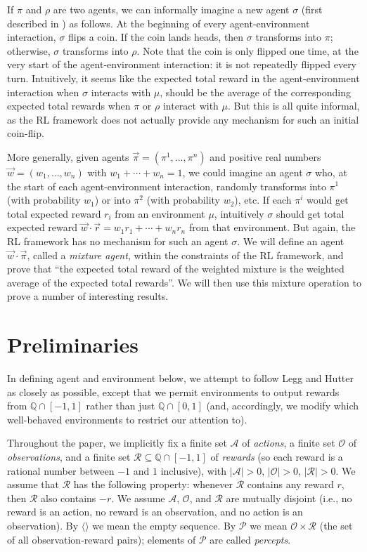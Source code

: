 \documentclass[twoside]{article}
\begin{document}
If $\pi$ and $\rho$ are two agents, we can informally imagine a new agent
$\sigma$ (first described in \cite{alexander2021reward})
as follows. At the beginning of every agent-environment interaction,
$\sigma$ flips a coin. If the coin lands heads, then $\sigma$ transforms into
$\pi$; otherwise, $\sigma$ transforms into $\rho$. Note that the coin is only
flipped one time, at the very start of the agent-environment interaction:
it is not repeatedly flipped every turn. Intuitively, it seems like the
expected total reward in the agent-environment interaction
when $\sigma$ interacts with $\mu$, should be the average
of the corresponding expected total rewards when $\pi$ or $\rho$ interact
with $\mu$. But this is all quite informal, as the RL
framework does not actually provide any mechanism for such an initial
coin-flip.

More generally, given agents $\vec{\pi}=(\pi^1,\ldots,\pi^n)$ and positive real
numbers
$\vec{w}=(w_1,\ldots,w_n)$ with $w_1+\cdots+w_n=1$, we could imagine an agent $\sigma$
who, at the start of each agent-environment interaction, randomly transforms
into $\pi^1$ (with probability $w_1$) or into $\pi^2$ (with probability $w_2$),
etc. If each $\pi^i$ would get total expected reward $r_i$ from an environment
$\mu$, intuitively $\sigma$ should get total expected reward
$\vec{w}\cdot \vec{r}=w_1r_1+\cdots+w_nr_n$ from that environment.
But again, the RL
framework has no mechanism for such an agent $\sigma$. We will define
an agent $\vec{w}\cdot\vec{\pi}$, called a \emph{mixture agent},
within the constraints
of the RL framework, and prove that ``the expected total reward of the
weighted mixture is the weighted average of the expected total rewards''.
We will then use this mixture operation to prove a number of interesting results.

\section{Preliminaries}

In defining agent and environment below, we attempt to follow
Legg and Hutter \cite{legg2007universal} as closely as possible,
except that we permit environments to output rewards from $\mathbb Q \cap [-1,1]$
rather than just $\mathbb Q\cap [0,1]$ (and, accordingly, we modify which well-behaved
environments to restrict our attention to).

Throughout the paper, we implicitly
fix a finite set $\mathcal A$ of \emph{actions},
a finite set $\mathcal O$ of \emph{observations},
and a finite set $\mathcal R\subseteq \mathbb Q\cap [-1,1]$ of \emph{rewards}
(so each reward is a rational number between $-1$ and $1$ inclusive),
with $|\mathcal A|>0$,
$|\mathcal O|>0$, $|\mathcal R|>0$.
We assume that $\mathcal R$ has the following property:
whenever $\mathcal R$ contains any reward $r$, then $\mathcal R$
also contains $-r$.
We assume $\mathcal A$, $\mathcal O$, and $\mathcal R$ are mutually disjoint
(i.e., no reward is an action, no reward is an observation, and no action is an
observation).
By $\langle\rangle$ we mean the empty sequence.
By $\mathcal P$ we mean $\mathcal O\times\mathcal R$ (the set of all observation-reward
pairs); elements of $\mathcal P$ are called \emph{percepts}.
\end{document}

